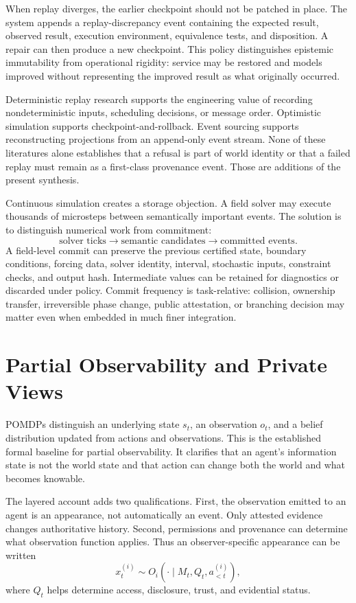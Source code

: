 \documentclass[11pt]{article}
\begin{document}
When replay diverges, the earlier checkpoint should not be patched in place. The system appends a replay-discrepancy event containing the expected result, observed result, execution environment, equivalence tests, and disposition. A repair can then produce a new checkpoint. This policy distinguishes epistemic immutability from operational rigidity: service may be restored and models improved without representing the improved result as what originally occurred.

Deterministic replay research supports the engineering value of recording nondeterministic inputs, scheduling decisions, or message order. Optimistic simulation supports checkpoint-and-rollback. Event sourcing supports reconstructing projections from an append-only event stream. None of these literatures alone establishes that a refusal is part of world identity or that a failed replay must remain as a first-class provenance event. Those are additions of the present synthesis.

Continuous simulation creates a storage objection. A field solver may execute thousands of microsteps between semantically important events. The solution is to distinguish numerical work from commitment:
\[
\text{solver ticks}\to\text{semantic candidates}\to\text{committed events}.
\]
A field-level commit can preserve the previous certified state, boundary conditions, forcing data, solver identity, interval, stochastic inputs, constraint checks, and output hash. Intermediate values can be retained for diagnostics or discarded under policy. Commit frequency is task-relative: collision, ownership transfer, irreversible phase change, public attestation, or branching decision may matter even when embedded in much finer integration.

\section{Partial Observability and Private Views}

POMDPs distinguish an underlying state $s_t$, an observation $o_t$, and a belief distribution updated from actions and observations. This is the established formal baseline for partial observability. It clarifies that an agent's information state is not the world state and that action can change both the world and what becomes knowable.

The layered account adds two qualifications. First, the observation emitted to an agent is an appearance, not automatically an event. Only attested evidence changes authoritative history. Second, permissions and provenance can determine what observation function applies. Thus an observer-specific appearance can be written
\[
x_t^{(i)}\sim O_i(\cdot\mid M_t,Q_t,a_{<t}^{(i)}),
\]
where $Q_t$ helps determine access, disclosure, trust, and evidential status.
\end{document}
